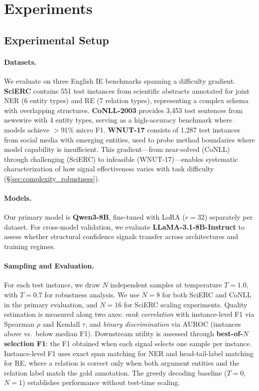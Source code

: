 \section{Experiments}
\label{sec:experiments}

\subsection{Experimental Setup}
\label{sec:setup}

\paragraph{Datasets.}
We evaluate on three English IE benchmarks spanning a difficulty gradient.
\textbf{SciERC} \cite{luan2018scierc} contains 551 test instances from scientific abstracts annotated for joint NER (6 entity types) and RE (7 relation types), representing a complex schema with overlapping structures.
\textbf{CoNLL-2003} \cite{tjongkimsang2003conll} provides 3{,}453 test sentences from newswire with 4 entity types, serving as a high-accuracy benchmark where models achieve ${>}$91\% micro F1.
\textbf{WNUT-17} \cite{derczynski2017wnut} consists of 1{,}287 test instances from social media with emerging entities, used to probe method boundaries where model capability is insufficient.
This gradient---from near-solved (CoNLL) through challenging (SciERC) to infeasible (WNUT-17)---enables systematic characterization of how signal effectiveness varies with task difficulty (\S\ref{sec:complexity_robustness}).

\paragraph{Models.}
Our primary model is \textbf{Qwen3-8B}, fine-tuned with LoRA ($r{=}32$) separately per dataset.
For cross-model validation, we evaluate \textbf{LLaMA-3.1-8B-Instruct} to assess whether structural confidence signals transfer across architectures and training regimes.

\paragraph{Sampling and Evaluation.}
For each test instance, we draw $N$ independent samples at temperature $T{=}1.0$, with $T{=}0.7$ for robustness analysis.
We use $N{=}8$ for both SciERC and CoNLL in the primary evaluation, and $N{=}16$ for SciERC scaling experiments.
Quality estimation is measured along two axes: \textit{rank correlation} with instance-level F1 via Spearman $\rho$ and Kendall $\tau$, and \textit{binary discrimination} via AUROC (instances above vs.\ below median F1).
Downstream utility is assessed through \textbf{best-of-$N$ selection F1}: the F1 obtained when each signal selects one sample per instance.
Instance-level F1 uses exact span matching for NER and head-tail-label matching for RE, where a relation is correct only when both argument entities and the relation label match the gold annotation.
The greedy decoding baseline ($T{=}0$, $N{=}1$) establishes performance without test-time scaling.

